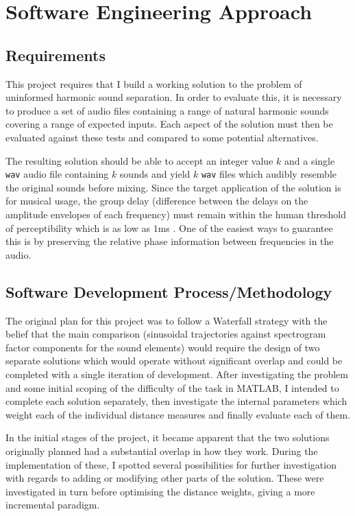\documentclass[12pt,a4paper,twoside,openright]{report}
\begin{document}
\section{Software Engineering Approach}

\subsection{Requirements}

This project requires that I build a working solution to the problem of uninformed harmonic sound separation. In order to evaluate this, it is necessary to produce a set of audio files containing a range of natural harmonic sounds covering a range of expected inputs. Each aspect of the solution must then be evaluated against these tests and compared to some potential alternatives.

The resulting solution should be able to accept an integer value $ k $ and a single \texttt{wav} audio file containing $ k $ sounds and yield $ k $ \texttt{wav} files which audibly resemble the original sounds before mixing. Since the target application of the solution is for musical usage, the group delay (difference between the delays on the amplitude envelopes of each frequency) must remain within the human threshold of perceptibility which is as low as $ 1 $ms \cite{blauert1978group}. One of the easiest ways to guarantee this is by preserving the relative phase information between frequencies in the audio.

\subsection{Software Development Process/Methodology}

The original plan for this project was to follow a Waterfall strategy with the belief that the main comparison (sinusoidal trajectories against spectrogram factor components for the sound elements) would require the design of two separate solutions which would operate without significant overlap and could be completed with a single iteration of development. After investigating the problem and some initial scoping of the difficulty of the task in MATLAB, I intended to complete each solution separately, then investigate the internal parameters which weight each of the individual distance measures and finally evaluate each of them.

In the initial stages of the project, it became apparent that the two solutions originally planned had a substantial overlap in how they work. During the implementation of these, I spotted several possibilities for further investigation with regards to adding or modifying other parts of the solution. These were investigated in turn before optimising the distance weights, giving a more incremental paradigm.
\end{document}
